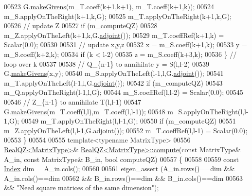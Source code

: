\begin{DoxyCode}
00523         G.\hyperlink{group___jacobi___module_af73c81e9cc139b7e0d877ce553b02ec0}{makeGivens}(m\_T.coeff(k+1,k+1), m\_T.coeff(k+1,k));
00524         m\_S.applyOnTheRight(k+1,k,G);
00525         m\_T.applyOnTheRight(k+1,k,G);
00526         \textcolor{comment}{// update Z}
00527         \textcolor{keywordflow}{if} (m\_computeQZ)
00528           m\_Z.applyOnTheLeft(k+1,k,G.\hyperlink{group___jacobi___module_a89c8ea615f8fa77ddd5810a1e5fde4da}{adjoint}());
00529         m\_T.coeffRef(k+1,k) = Scalar(0.0);
00530 
00531         \textcolor{comment}{// update x,y,z}
00532         x = m\_S.coeff(k+1,k);
00533         y = m\_S.coeff(k+2,k);
00534         \textcolor{keywordflow}{if} (k < l-2)
00535           z = m\_S.coeff(k+3,k);
00536       \} \textcolor{comment}{// loop over k}
00537 
00538       \textcolor{comment}{// Q\_\{n-1\} to annihilate y = S(l,l-2)}
00539       G.\hyperlink{group___jacobi___module_af73c81e9cc139b7e0d877ce553b02ec0}{makeGivens}(x,y);
00540       m\_S.applyOnTheLeft(l-1,l,G.\hyperlink{group___jacobi___module_a89c8ea615f8fa77ddd5810a1e5fde4da}{adjoint}());
00541       m\_T.applyOnTheLeft(l-1,l,G.\hyperlink{group___jacobi___module_a89c8ea615f8fa77ddd5810a1e5fde4da}{adjoint}());
00542       \textcolor{keywordflow}{if} (m\_computeQZ)
00543         m\_Q.applyOnTheRight(l-1,l,G);
00544       m\_S.coeffRef(l,l-2) = Scalar(0.0);
00545 
00546       \textcolor{comment}{// Z\_\{n-1\} to annihilate T(l,l-1)}
00547       G.\hyperlink{group___jacobi___module_af73c81e9cc139b7e0d877ce553b02ec0}{makeGivens}(m\_T.coeff(l,l),m\_T.coeff(l,l-1));
00548       m\_S.applyOnTheRight(l,l-1,G);
00549       m\_T.applyOnTheRight(l,l-1,G);
00550       \textcolor{keywordflow}{if} (m\_computeQZ)
00551         m\_Z.applyOnTheLeft(l,l-1,G.\hyperlink{group___jacobi___module_a89c8ea615f8fa77ddd5810a1e5fde4da}{adjoint}());
00552       m\_T.coeffRef(l,l-1) = Scalar(0.0);
00553     \}
00554 
00555   \textcolor{keyword}{template}<\textcolor{keyword}{typename} MatrixType>
00556     \hyperlink{group___eigenvalues___module}{RealQZ<MatrixType>}& \hyperlink{group___eigenvalues___module_a2b6847964d9f1903193cc3e67c196849}{RealQZ<MatrixType>::compute}(\textcolor{keyword}{const} 
      MatrixType& A\_in, \textcolor{keyword}{const} MatrixType& B\_in, \textcolor{keywordtype}{bool} computeQZ)
00557     \{
00558 
00559       \textcolor{keyword}{const} \hyperlink{group___eigenvalues___module_a6201e534e901b5f4e66f72c176b534a3}{Index} dim = A\_in.cols();
00560 
00561       eigen\_assert (A\_in.rows()==dim && A\_in.cols()==dim 
00562           && B\_in.rows()==dim && B\_in.cols()==dim 
00563           && \textcolor{stringliteral}{"Need square matrices of the same dimension"});

\end{DoxyCode}
